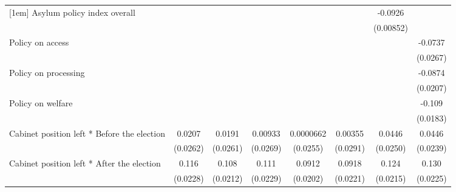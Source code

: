 \begin{table}[htbp]
\begin{tabular}{l*{7}{c}}
[1em]
Asylum policy index overall&                     &                     &                     &                     &                     &     -0.0926\sym{***}&                     \\
                    &                     &                     &                     &                     &                     &   (0.00852)         &                     \\
[1em]
Policy on access    &                     &                     &                     &                     &                     &                     &     -0.0737\sym{**} \\
                    &                     &                     &                     &                     &                     &                     &    (0.0267)         \\
[1em]
Policy on processing&                     &                     &                     &                     &                     &                     &     -0.0874\sym{***}\\
                    &                     &                     &                     &                     &                     &                     &    (0.0207)         \\
[1em]
Policy on welfare   &                     &                     &                     &                     &                     &                     &      -0.109\sym{***}\\
                    &                     &                     &                     &                     &                     &                     &    (0.0183)         \\
[1em]
Cabinet position left * Before the election&      0.0207         &      0.0191         &     0.00933         &   0.0000662         &     0.00355         &      0.0446         &      0.0446         \\
                    &    (0.0262)         &    (0.0261)         &    (0.0269)         &    (0.0255)         &    (0.0291)         &    (0.0250)         &    (0.0239)         \\
[1em]
Cabinet position left * After the election&       0.116\sym{***}&       0.108\sym{***}&       0.111\sym{***}&      0.0912\sym{***}&      0.0918\sym{***}&       0.124\sym{***}&       0.130\sym{***}\\
                    &    (0.0228)         &    (0.0212)         &    (0.0229)         &    (0.0202)         &    (0.0221)         &    (0.0215)         &    (0.0225)         \\

\end{tabular}
\end{table}
